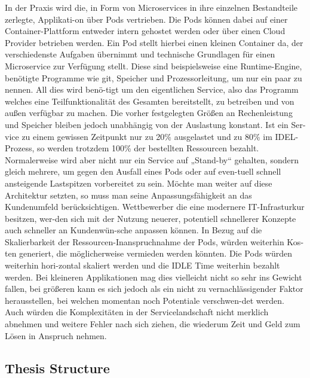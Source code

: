 \documentclass[11pt]{article}
\begin{document}
In der Praxis wird die, in Form von Microservices in ihre einzelnen Bestandteile zerlegte, Applikati-on über Pods vertrieben. Die Pods können dabei auf einer Container-Plattform entweder intern gehostet werden oder über einen Cloud Provider betrieben werden. Ein Pod stellt hierbei einen kleinen Container da, der verschiedenste Aufgaben übernimmt und technische Grundlagen für einen Microservice zur Verfügung stellt. Diese sind beispielsweise eine Runtime-Engine, benötigte Programme wie git, Speicher und Prozessorleitung, um nur ein paar zu nennen. All dies wird benö-tigt um den eigentlichen Service, also das Programm welches eine Teilfunktionalität des Gesamten bereitstellt, zu betreiben und von außen verfügbar zu machen. Die vorher festgelegten Größen an Rechenleistung und Speicher bleiben jedoch unabhängig von der Auslastung konstant. Ist ein Ser-vice zu einem gewissen Zeitpunkt nur zu 20\% ausgelastet und zu 80\% im IDEL-Prozess, so werden trotzdem 100\% der bestellten Ressourcen bezahlt. Normalerweise wird aber nicht nur ein Service auf „Stand-by“ gehalten, sondern gleich mehrere, um gegen den Ausfall eines Pods oder auf even-tuell schnell ansteigende Lastspitzen vorbereitet zu sein. 
Möchte man weiter auf diese Architektur setzten, so muss man seine Anpassungsfähigkeit an das Kundenumfeld berücksichtigen. Wettbewerber die eine modernere IT-Infrasturkur besitzen, wer-den sich mit der Nutzung neuerer, potentiell schnellerer Konzepte auch schneller an Kundenwün-sche anpassen können. 
In Bezug auf die Skalierbarkeit der Ressourcen-Inanspruchnahme der Pods, würden weiterhin Kos-ten generiert, die möglicherweise vermieden werden könnten. Die Pods würden weiterhin hori-zontal skaliert werden und die IDLE Time weiterhin bezahlt werden. Bei kleineren Applikationen mag dies vielleicht nicht so sehr ins Gewicht fallen, bei größeren kann es sich jedoch als ein nicht zu vernachlässigender Faktor herausstellen, bei welchen momentan noch Potentiale verschwen-det werden. Auch würden die Komplexitäten in der Servicelandschaft nicht merklich abnehmen und weitere Fehler nach sich ziehen, die wiederum Zeit und Geld zum Lösen in Anspruch nehmen.  
\subsection{Thesis Structure}
\end{document}
